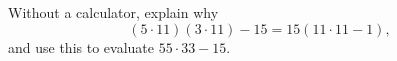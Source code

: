 Without a calculator, explain why
\[(5\cdot11)(3\cdot11)-15=15\left(11\cdot11-1\right),\]
and use this to evaluate $55\cdot33-15$.
